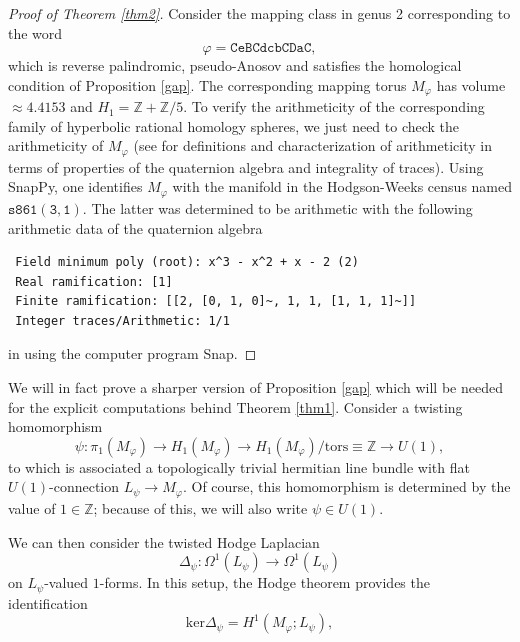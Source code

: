 \documentclass[11pt]{amsart}
\theoremstyle{definition}
\theoremstyle{remark}
\begin{document}
\begin{proof}[Proof of Theorem \ref{thm2}] Consider the mapping class in genus 2 corresponding to the word
\begin{equation*}
\varphi=\mathtt{CeBCdcbCDaC},
\end{equation*}
which is reverse palindromic, pseudo-Anosov and satisfies the homological condition of Proposition \ref{gap}. The corresponding mapping torus $M_\varphi$ has volume $\approx 4.4153$ and $H_1=\mathbb{Z}+\mathbb{Z}/5$. To verify the arithmeticity of the corresponding family of hyperbolic rational homology spheres, we just need to check the arithmeticity of $M_\varphi$ (see \cite[Ch. 8 and 10]{MR} for definitions and characterization of arithmeticity in terms of properties of the quaternion algebra and integrality of traces). Using SnapPy, one identifies $M_\varphi$ with the manifold in the Hodgson-Weeks census named $\mathtt{s861(3,1)}$. The latter was determined to be arithmetic with the following arithmetic data of the quaternion algebra
\begin{verbatim}
 Field minimum poly (root): x^3 - x^2 + x - 2 (2)
 Real ramification: [1]
 Finite ramification: [[2, [0, 1, 0]~, 1, 1, [1, 1, 1]~]]
 Integer traces/Arithmetic: 1/1
\end{verbatim}
in \cite{Snap} using the computer program Snap.
\end{proof}
We will in fact prove a sharper version of Proposition \ref{gap} which will be needed for the explicit computations behind Theorem \ref{thm1}. Consider a twisting homomorphism
\begin{equation}\label{twisthom}
\psi:\pi_1(M_\varphi)\rightarrow H_1(M_{\varphi})\rightarrow H_1(M_{\varphi})/\mathrm{tors}\equiv\mathbb{Z}\rightarrow U(1),
\end{equation}
to which is associated a topologically trivial hermitian line bundle with flat $U(1)$-connection $L_{\psi}\rightarrow M_\varphi$. Of course, this homomorphism is determined by the value of $1\in\mathbb{Z}$; because of this, we will also write $\psi\in U(1)$.
\par
We can then consider the twisted Hodge Laplacian
\begin{equation*}
\Delta_{\psi}:\Omega^1(L_{\psi})\rightarrow \Omega^1(L_{\psi})
\end{equation*}
on $L_{\psi}$-valued $1$-forms. In this setup, the Hodge theorem provides the identification
\begin{equation*}
\mathrm{ker}\Delta_\psi=H^1(M_\varphi;L_\psi),
\end{equation*}
\end{document}
